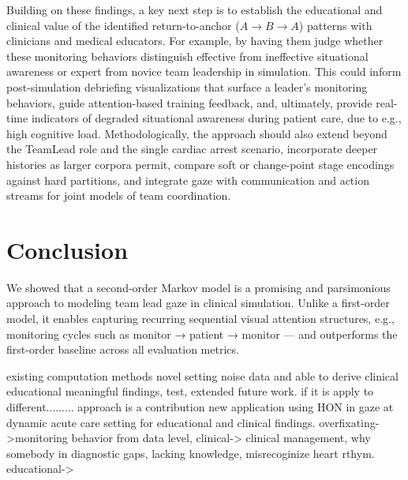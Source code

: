 \documentclass[runningheads]{llncs}
\begin{document}
Building on these findings, a key next step is to establish the educational and clinical value of the identified return-to-anchor ($A\rightarrow B\rightarrow A$) patterns with clinicians and medical educators. For example, by having them judge whether these monitoring behaviors distinguish effective from ineffective situational awareness or expert from novice team leadership in simulation. This could inform post-simulation debriefing visualizations that surface a leader's monitoring behaviors, guide attention-based training feedback, and, ultimately, provide real-time indicators of degraded situational awareness during patient care, due to e.g., high cognitive load. Methodologically, the approach should also extend beyond the TeamLead role and the single cardiac arrest scenario, incorporate deeper histories as larger corpora permit, compare soft or change-point stage encodings against hard partitions, and integrate gaze with communication and action streams for joint models of team coordination.

\section{Conclusion}

We showed that a second-order Markov model is a promising and parsimonious approach to modeling team lead gaze in clinical simulation. Unlike a first-order model, it enables capturing recurring sequential visual attention structures, e.g., monitoring cycles such as monitor → patient → monitor — and outperforms the first-order baseline across all evaluation metrics. 


existing computation methods novel setting noise data and able to derive clinical educational meaningful findings,  test, extended future work. if it is apply to different.........
 approach is a contribution new application using HON in gaze at dynamic acute care setting for educational and clinical findings. overfixating->monitoring behavior from data level, clinical-> clinical management, why somebody in diagnostic gaps, lacking knowledge, misrecoginize heart rthym. educational->



\end{document}

